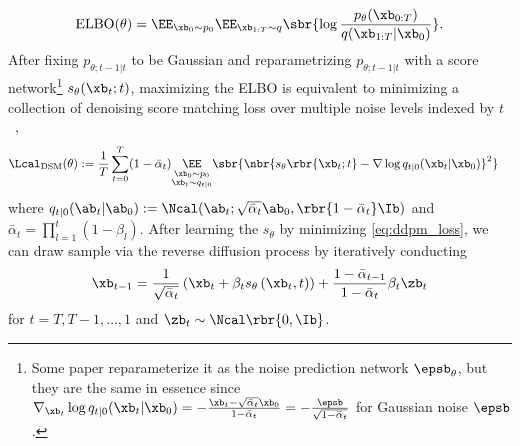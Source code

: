 $$
{\rm ELBO}(\theta) = \EE_{\xb_0\sim p_0}\EE_{\xb_{1:T}\sim q}\sbr{\log \frac{p_\theta(\xb_{0:T})}{q(\xb_{1:T}|\xb_0)}}.
$$
After fixing $p_{\theta;t-1|t}$ to be Gaussian and reparametrizing $p_{\theta;t-1|t}$ with a score network\footnote{Some paper reparameterize it as the noise prediction network $\epsb_\theta$, but they are the same in essence since $\nabla_{\xb_t} \log q_{t|0}(\xb_t|\xb_0) = -\frac{\xb_t -\sqrt{\bar\alpha_t}\xb_0}{1 -\bar\alpha_t}=-\frac{\epsb}{\sqrt{1 -\bar\alpha_t}}$ for Gaussian noise $\epsb$.} $s_\theta(\xb_t;t)$, maximizing the ELBO is equivalent to minimizing a collection of denoising score matching loss over multiple noise levels indexed by $t$~\cite{vincent2011connection,ho2020denoising},
\begin{equation}
    \begin{aligned}
        &\Lcal_{\rm DSM}(\theta):=\frac{1}{T}\sum_{t=0}^T(1 -\bar\alpha_t)\underset{\substack{\xb_0\sim p_0\\\xb_t\sim q_{t|0}}}{\EE}\sbr{\nbr{ s_\theta\rbr{\xb_t; t} - \nabla \log q_{t|0}(\xb_t|\xb_0)}^2}\label{eq:ddpm_loss}
    \end{aligned}
\end{equation}
where $q_{t|0}(\ab_t|\ab_0):=\Ncal(\ab_t;\sqrt{\bar\alpha_t}\ab_0, \rbr{1 - \bar\alpha_t}\Ib)$ and $\bar\alpha_t = \prod_{l=1}^t (1-\beta_l)$. 
After learning the $s_\theta$ by minimizing \eqref{eq:ddpm_loss}, we can draw sample via the reverse diffusion process by iteratively conducting
\begin{equation}
    \xb_{t-1}=\frac{1}{\sqrt{\bar\alpha_t}}\left(\xb_t+\beta_t s_\theta\left(\xb_t, t\right)\right)+\frac{1-\bar\alpha_{t-1}}{1-\bar\alpha_t}\beta_t \zb_t\label{eq:annealed_langevin_2}
\end{equation}
for $t = T, T-1,\dots, 1$ and $\zb_t\sim\Ncal\rbr{0,\Ib}$.


